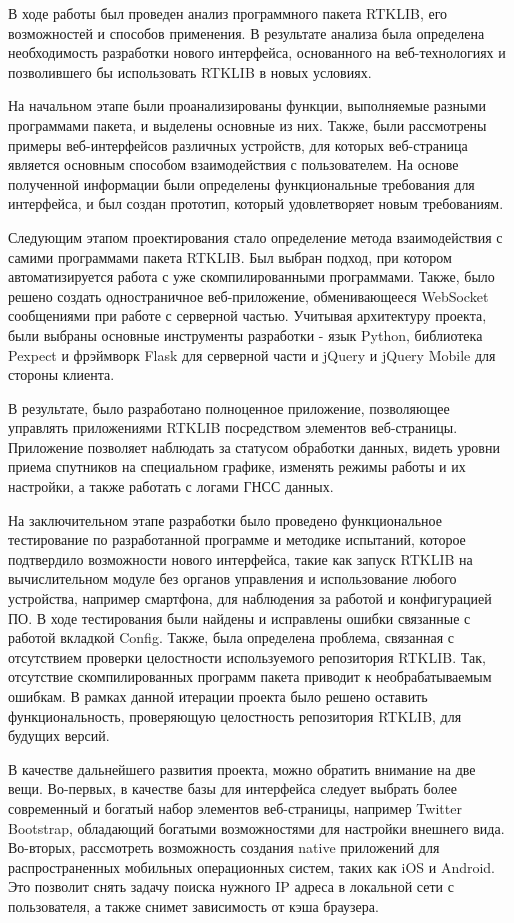 \conclusion

В ходе работы был проведен анализ программного пакета RTKLIB, его возможностей и способов применения. В результате анализа была определена необходимость разработки нового интерфейса, основанного на веб-технологиях и позволившего бы использовать RTKLIB в новых условиях.

На начальном этапе были проанализированы функции, выполняемые разными программами пакета, и выделены основные из них. Также, были рассмотрены примеры веб-интерфейсов различных устройств, для которых веб-страница является основным способом взаимодействия с пользователем. На основе полученной информации были определены функциональные требования для интерфейса, и был создан прототип, который удовлетворяет новым требованиям.

Следующим этапом проектирования стало определение метода взаимодействия с самими программами пакета RTKLIB. Был выбран подход, при котором автоматизируется работа с уже скомпилированными программами. Также, было решено создать одностраничное веб-приложение, обменивающееся WebSocket сообщениями при работе с серверной частью. Учитывая архитектуру проекта, были выбраны основные инструменты разработки - язык Python, библиотека Pexpect и фрэймворк Flask для серверной части и jQuery и jQuery Mobile для стороны клиента.

В результате, было разработано полноценное приложение, позволяющее управлять приложениями RTKLIB посредством элементов веб-страницы. Приложение позволяет наблюдать за статусом обработки данных, видеть уровни приема спутников на специальном графике, изменять режимы работы и их настройки, а также работать с логами ГНСС данных.

На заключительном этапе разработки было проведено функциональное тестирование по разработанной программе и методике испытаний, которое подтвердило возможности нового интерфейса, такие как запуск RTKLIB на вычислительном модуле без органов управления и использование любого устройства, например смартфона, для наблюдения за работой и конфигурацией ПО. В ходе тестирования были найдены и исправлены ошибки связанные с работой вкладкой Config. Также, была определена проблема, связанная с отсутствием проверки целостности используемого репозитория RTKLIB. Так, отсутствие скомпилированных программ пакета приводит к необрабатываемым ошибкам. В рамках данной итерации проекта было решено оставить функциональность, проверяющую целостность репозитория RTKLIB, для будущих версий.

В качестве дальнейшего развития проекта, можно обратить внимание на две вещи. Во-первых, в качестве базы для интерфейса следует выбрать более современный и богатый набор элементов веб-страницы, например Twitter Bootstrap, обладающий богатыми возможностями для настройки внешнего вида. Во-вторых, рассмотреть возможность создания native приложений для распространенных мобильных операционных систем, таких как iOS и Android. Это позволит снять задачу поиска нужного IP адреса в локальной сети с пользователя, а также снимет зависимость от кэша браузера.